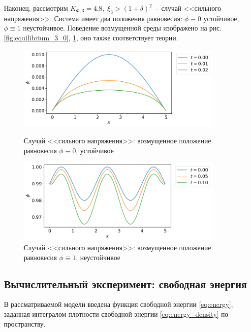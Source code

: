 Наконец, рассмотрим $K_{\Phi, 3} = 4.8, \; \xi_3 > (1 + \delta)^2$~-- случай <<сильного напряжения>>. Система имеет два положения равновесия: $\phi \equiv 0$ устойчивое, $\phi \equiv 1$ неустойчивое. Поведение возмущенной среды изображено на рис. \ref{fig:equilibrium_3_0}, \ref{fig:equilibrium_3_1}, оно также соответствует теории.

\begin{figure}[!t]
	\centering
	\includegraphics[width=0.9\textwidth]{figures/equilibrium_3_0.png}
	\vspace{-0.3cm}
	\caption{Случай <<сильного напряжения>>: возмущенное положение равновесия $\phi \equiv 0$, устойчивое}
	\label{fig:equilibrium_3_0}
	\vspace{0.5cm}
	
	\includegraphics[width=0.9\textwidth]{figures/equilibrium_3_1.png}
	\vspace{-0.3cm}
	\caption{Случай <<сильного напряжения>>: возмущенное положение равновесия $\phi \equiv 1$, неустойчивое}
	\label{fig:equilibrium_3_1}
\end{figure}


\subsection{Вычислительный эксперимент: свободная энергия}

В рассматриваемой модели введена функция свободной энергии \eqref{eq:energy}, заданная интегралом плотности свободной энергии \eqref{eq:energy_density} по пространству.

